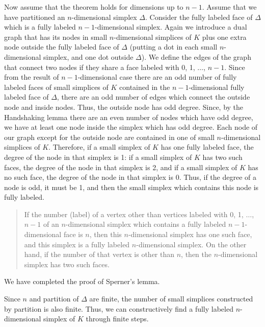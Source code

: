 \documentclass[reqno]{amsart}
\begin{document}
Now assume that the theorem holds for dimensions up to $n-1$. Assume that we have partitioned an $n$-dimensional simplex $\Delta$. Consider the fully labeled face of $\Delta$ which is a fully labeled $n-1$-dimensional simplex. Again we introduce a dual graph that has its nodes in small $n$-dimensional simplices of $K$ plus one extra node outside the fully labeled face of $\Delta$ (putting a dot in each small $n$-dimensional simplex, and one dot outside $\Delta$). We define the edges of the graph that connect two nodes if they share a face labeled with 0, 1, $\dots$, $n-1$. Since from the result of $n-1$-dimensional case there are an odd number of fully labeled faces of small simplices of $K$ contained in the $n-1$-dimensional fully labeled face of $\Delta$, there are an odd number of edges which connect the outside node and inside nodes. Thus, the outside node has odd degree. Since, by the Handshaking lemma there are an even number of nodes which have odd degree, we have at least one node inside the simplex which has odd degree. Each node of our graph except for the outside node are contained in one of small $n$-dimensional simplices of $K$. Therefore, if a small simplex of $K$ has one fully labeled face, the degree of the node in that simplex is 1: if a small simplex of $K$ has two such faces, the degree of the node in that simplex is 2, and if a small simplex of $K$ has no such face, the degree of the node in that simplex is 0. Thus, if the degree of a node is odd, it must be 1, and then the small simplex which contains this node is fully labeled.

\begin{quote}
If the number (label) of a vertex other than vertices labeled with 0, 1, $\dots$, $n-1$ of an $n$-dimensional simplex which contains a fully labeled $n-1$-dimensional face is $n$, then this $n$-dimensional simplex has one such face, and this simplex is a fully labeled $n$-dimensional simplex. On the other hand, if the number of that vertex is other than $n$, then the $n$-dimensional simplex has two such faces.
\end{quote}

We have completed the proof of Sperner's lemma.

Since $n$ and partition of $\Delta$ are finite, the number of small simplices constructed by partition is also finite. Thus, we can constructively find a fully labeled $n$-dimensional simplex of $K$ through finite steps.
\end{document}

